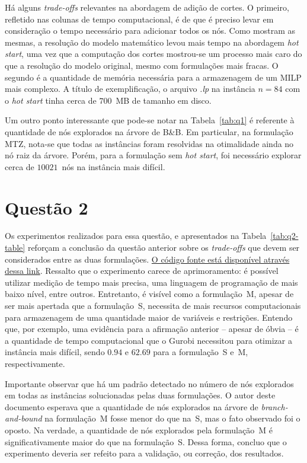 \documentclass{article}
\begin{document}
Há alguns \textit{trade-offs} relevantes na abordagem de adição de cortes.
O primeiro, refletido nas colunas de tempo computacional, é de que é preciso levar em consideração o tempo necessário para adicionar todos os nós.
Como mostram as mesmas, a resolução do modelo matemático levou mais tempo na abordagem \textsl{hot start}, uma vez que a computação dos cortes mostrou-se um processo mais caro do que a resolução do modelo original, mesmo com formulações mais fracas.
O segundo é a quantidade de memória necessária para a armazenagem de um MILP mais complexo.
A título de exemplificação, o arquivo \textsl{.lp} na instância $n = 84$ com o \textsl{hot start} tinha cerca de $700$~MB de tamanho em disco.

Um outro ponto interessante que pode-se notar na Tabela~\ref{tab:q1} é referente à quantidade de nós explorados na árvore de B\&B.
Em particular, na formulação MTZ, nota-se que todas as instâncias foram resolvidas na otimalidade ainda no nó raiz da árvore.
Porém, para a formulação sem \textsl{hot start}, foi necessário explorar cerca de $10021$~nós na instância mais difícil.

\section{Questão 2}

Os experimentos realizados para essa questão, e apresentados na Tabela~\ref{tab:q2-table} reforçam a conclusão da questão anterior sobre os \textit{trade-offs} que devem ser considerados entre as duas formulações.
\href{https://github.com/jose-joaquim/ogp-ufmg20251/blob/main/2nd-exam/question3.py}{O código fonte está disponível através dessa link}.
Ressalto que o experimento carece de aprimoramento: é possível utilizar medição de tempo mais precisa, uma linguagem de programação de mais baixo nível, entre outros.
Entretanto, é visível como a formulação~M, apesar de ser mais apertada que a formulação~S, necessita de mais recursos computacionais para armazenagem de uma quantidade maior de variáveis e restrições.
Entendo que, por exemplo, uma evidência para a afirmação anterior -- apesar de óbvia -- é a quantidade de tempo computacional que o Gurobi necessitou para otimizar a instância mais difícil, sendo $0.94$ e $62.69$ para a formulação~S e~M, respectivamente.

Importante observar que há um padrão detectado no número de nós explorados em todas as instâncias solucionadas pelas duas formulações.
O autor deste documento esperava que a quantidade de nós explorados na árvore de \textit{branch-and-bound} na formulação~M fosse menor do que na~S, mas o fato observado foi o oposto.
Na verdade, a quantidade de nós explorados pela formulação~M é significativamente maior do que na formulação~S.
Dessa forma, concluo que o experimento deveria ser refeito para a validação, ou correção, dos resultados.
\end{document}
